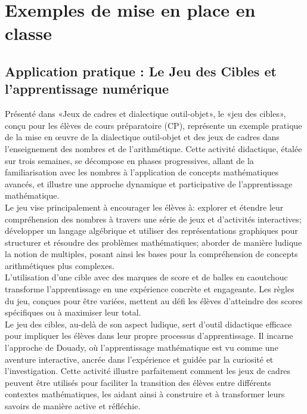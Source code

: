 \section{Exemples de mise en place en classe}

\subsection{Application pratique : Le Jeu des Cibles et l'apprentissage numérique}

Présenté dans «Jeux de cadres et dialectique outil-objet»,
le «jeu des cibles»,
conçu pour les élèves de cours préparatoire (CP),
représente un exemple pratique de la mise en œuvre de la dialectique outil-objet et des jeux de cadres dans l'enseignement des nombres et de l'arithmétique.
Cette activité didactique,
étalée sur trois semaines,
se décompose en phases progressives,
allant de la familiarisation avec les nombres à l'application de concepts mathématiques avancés,
et illustre une approche dynamique et participative de l'apprentissage mathématique.\\

Le jeu vise principalement à encourager les élèves à:
explorer et étendre leur compréhension des nombres à travers une série de jeux et d'activités interactives;
développer un langage algébrique et utiliser des représentations graphiques pour structurer et résoudre des problèmes mathématiques;
aborder de manière ludique la notion de multiples,
posant ainsi les bases pour la compréhension de concepts arithmétiques plus complexes.\\

L'utilisation d'une cible avec des marques de score et de balles en caoutchouc transforme l'apprentissage en une expérience concrète et engageante.
Les règles du jeu,
conçues pour être variées,
mettent au défi les élèves d'atteindre des scores spécifiques ou à maximiser leur total.\\

Le jeu des cibles, au-delà de son aspect ludique,
sert d'outil didactique efficace pour impliquer les élèves dans leur propre processus d'apprentissage.
Il incarne l'approche de Douady,
où l'apprentissage mathématique est vu comme une aventure interactive,
ancrée dans l'expérience et guidée par la curiosité et l'investigation.
Cette activité illustre parfaitement comment les jeux de cadres peuvent être utilisés pour faciliter la transition des élèves entre différents contextes mathématiques,
les aidant ainsi à construire et à transformer leurs savoirs de manière active et réfléchie.\\

